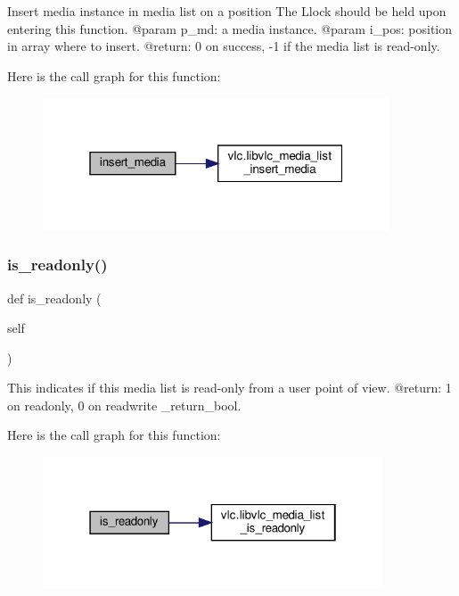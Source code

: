 \begin{DoxyVerb}Insert media instance in media list on a position
The L{lock} should be held upon entering this function.
@param p_md: a media instance.
@param i_pos: position in array where to insert.
@return: 0 on success, -1 if the media list is read-only.
\end{DoxyVerb}
 Here is the call graph for this function\+:
\nopagebreak
\begin{figure}[H]
\begin{center}
\leavevmode
\includegraphics[width=292pt]{classvlc_1_1_media_list_aa87d8a88365b1fa73a9c947a264aec7b_cgraph}
\end{center}
\end{figure}
\mbox{\label{classvlc_1_1_media_list_a3e80b240ea117697171e9abfa72b095d}} 
\subsubsection{\texorpdfstring{is\+\_\+readonly()}{is\_readonly()}}
{\footnotesize\ttfamily def is\+\_\+readonly (\begin{DoxyParamCaption}\item[{}]{self }\end{DoxyParamCaption})}

\begin{DoxyVerb}This indicates if this media list is read-only from a user point of view.
@return: 1 on readonly, 0 on readwrite \libvlc_return_bool.
\end{DoxyVerb}
 Here is the call graph for this function\+:
\nopagebreak
\begin{figure}[H]
\begin{center}
\leavevmode
\includegraphics[width=286pt]{classvlc_1_1_media_list_a3e80b240ea117697171e9abfa72b095d_cgraph}
\end{center}
\end{figure}
\mbox{\label{classvlc_1_1_media_list_aea2e5bdf573ff28024234a9fd746edfc}} 
